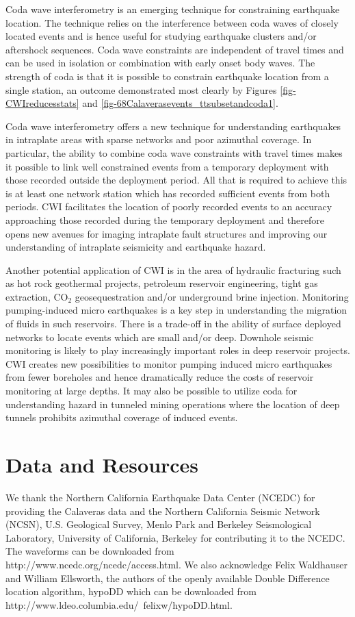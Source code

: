 \documentclass[extra, onecolumn, doublespacing]{gji}
\begin{document}
Coda wave interferometry is an emerging technique for constraining
earthquake location. The technique relies on the interference
between coda waves of closely located events and is hence useful for
studying earthquake clusters and/or aftershock sequences. Coda wave
constraints are independent of travel times and can be used in
isolation or combination with early onset body waves. The strength
of coda is that it is possible to constrain earthquake location from
a single station, an outcome demonstrated most clearly by Figures
\ref{fig-CWIreducesstats} and
\ref{fig-68Calaverasevents_ttsubsetandcoda1}.

Coda wave interferometry offers a new technique for understanding
earthquakes in intraplate areas with sparse networks and poor
azimuthal coverage. In particular, the ability to combine coda wave
constraints with travel times makes it possible to link well
constrained events from a temporary deployment with those recorded
outside the deployment period. All that is required to achieve this
is at least one network station which has recorded sufficient events
from both periods. CWI facilitates the location of poorly recorded
events to an accuracy approaching those recorded during the
temporary deployment and therefore opens new avenues for imaging
intraplate fault structures and improving our understanding of
intraplate seismicity and earthquake hazard.

Another potential application of CWI is in the area of hydraulic
fracturing such as hot rock geothermal projects, petroleum reservoir engineering,
tight gas extraction, CO$_2$ geosequestration and/or underground brine injection.
Monitoring pumping-induced micro earthquakes
is a key step in understanding the migration of fluids in such
reservoirs. There is a trade-off in the ability of surface deployed
networks to locate events which are small and/or deep. Downhole
seismic monitoring is likely to play increasingly important roles in
deep reservoir projects. CWI creates new possibilities to monitor
pumping induced micro earthquakes from fewer boreholes and hence
dramatically reduce the costs of reservoir monitoring at large
depths. It may also be possible to utilize coda for understanding
hazard in tunneled mining operations where the location of deep
tunnels prohibits azimuthal coverage of induced events.

\section{Data and Resources}
We thank the Northern California Earthquake Data Center (NCEDC) for
providing the Calaveras data and the Northern California Seismic
Network (NCSN), U.S. Geological Survey, Menlo Park and Berkeley
Seismological Laboratory, University of California, Berkeley for
contributing it to the NCEDC. The waveforms can be downloaded from
http://www.ncedc.org/ncedc/access.html. We also acknowledge Felix
Waldhauser and William Ellsworth, the authors of the openly
available Double Difference location algorithm, hypoDD which can be
downloaded from http://www.ldeo.columbia.edu/~felixw/hypoDD.html.
\end{document}
